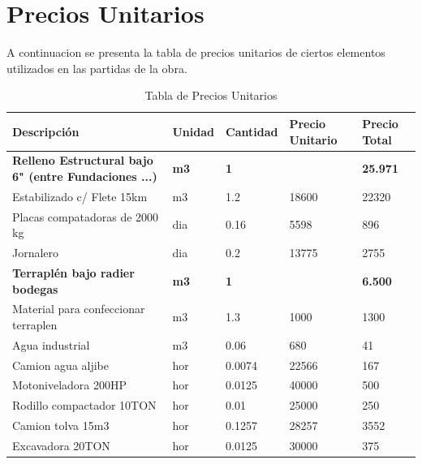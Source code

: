 \documentclass{article} %
\begin{document}
\newpage
\section{Precios Unitarios}

A continuacion se presenta la tabla de precios unitarios de ciertos elementos utilizados en las partidas de la obra.

\begin{table}[H]
    \centering
    \caption{Tabla de Precios Unitarios}
    \label{tab:precios_unitarios}
    \begin{tabular}{lllll}
    \toprule
                                           Descripción & Unidad &  Cantidad & Precio Unitario & Precio Total \\
    \midrule
    \textbf{Relleno Estructural bajo 6" (entre Fundaciones ...)} & \textbf{m3} & \textbf{1} & \textbf{} & \textbf{25.971} \\
                            Estabilizado c/ Flete 15km &     m3 &       1.2 &           18600 &        22320 \\
                        Placas compatadoras de 2000 kg &    dia &      0.16 &            5598 &          896 \\
                                             Jornalero &    dia &       0.2 &           13775 &         2755 \\
                         \textbf{Terraplén bajo radier bodegas} & \textbf{m3} & \textbf{1} & \textbf{} & \textbf{6.500} \\
                  Material para confeccionar terraplen &     m3 &       1.3 &            1000 &         1300 \\
                                       Agua industrial &     m3 &      0.06 &             680 &           41 \\
                                    Camion agua aljibe &    hor &    0.0074 &           22566 &          167 \\
                                  Motoniveladora 200HP &    hor &    0.0125 &           40000 &          500 \\
                             Rodillo compactador 10TON &    hor &      0.01 &           25000 &          250 \\
                                     Camion tolva 15m3 &    hor &    0.1257 &           28257 &         3552 \\
                                      Excavadora 20TON &    hor &    0.0125 &           30000 &          375 \\

\end{tabular}
\end{table}
\end{document}
